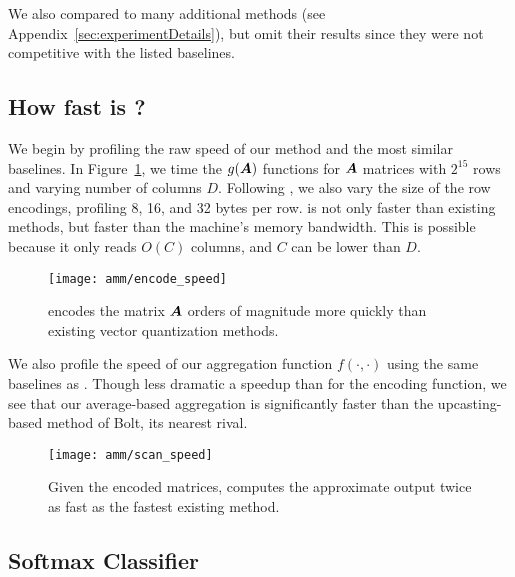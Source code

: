 We also compared to many additional methods (see Appendix~\ref{sec:experimentDetails}), but omit their results since they were not competitive with the listed baselines.

\subsection{How fast is \ours?}

We begin by profiling the raw speed of our method and the most similar baselines. In Figure~\ref{fig:encodeSpeed}, we time the $g(\bm{A})$ functions for $\bm{A}$ matrices with $2^{15}$ rows and varying number of columns $D$. Following \cite{bolt}, we also vary the size of the row encodings, profiling 8, 16, and 32 bytes per row. \oursp is not only faster than existing methods, but faster than the machine's memory bandwidth. This is possible because it only reads $O(C)$ columns, and $C$ can be lower than $D$.

\begin{figure}[h]
\begin{center}
\texttt{[image: amm/encode\_speed]}
\caption{\oursp encodes the matrix $\bm{A}$ orders of magnitude more quickly than existing vector quantization methods.}
\label{fig:encodeSpeed}
\end{center}
\end{figure}

We also profile the speed of our aggregation function $f(\cdot, \cdot)$ using the same baselines as \citet{bolt}. Though less dramatic a speedup than for the encoding function, we see that our average-based aggregation is significantly faster than the upcasting-based method of Bolt, its nearest rival.

\begin{figure}[h]
\begin{center}
\texttt{[image: amm/scan\_speed]}
\caption{Given the encoded matrices, \oursp computes the approximate output twice as fast as the fastest existing method.}
\label{fig:scanSpeed}
\end{center}
\end{figure}

\subsection{Softmax Classifier}

